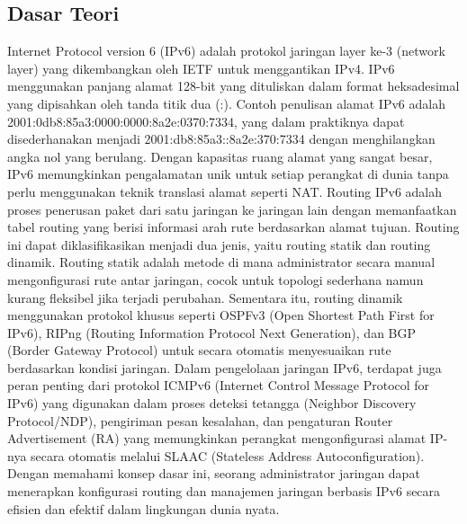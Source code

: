 \subsection{Dasar Teori}
Internet Protocol version 6 (IPv6) adalah protokol jaringan layer ke-3 (network layer) yang dikembangkan oleh IETF untuk menggantikan IPv4. IPv6 menggunakan panjang alamat 128-bit yang dituliskan dalam format heksadesimal yang dipisahkan oleh tanda titik dua (:). Contoh penulisan alamat IPv6 adalah 2001:0db8:85a3:0000:0000:8a2e:0370:7334, yang dalam praktiknya dapat disederhanakan menjadi 2001:db8:85a3::8a2e:370:7334 dengan menghilangkan angka nol yang berulang. Dengan kapasitas ruang alamat yang sangat besar, IPv6 memungkinkan pengalamatan unik untuk setiap perangkat di dunia tanpa perlu menggunakan teknik translasi alamat seperti NAT. Routing IPv6 adalah proses penerusan paket dari satu jaringan ke jaringan lain dengan memanfaatkan tabel routing yang berisi informasi arah rute berdasarkan alamat tujuan. Routing ini dapat diklasifikasikan menjadi dua jenis, yaitu routing statik dan routing dinamik. Routing statik adalah metode di mana administrator secara manual mengonfigurasi rute antar jaringan, cocok untuk topologi sederhana namun kurang fleksibel jika terjadi perubahan. Sementara itu, routing dinamik menggunakan protokol khusus seperti OSPFv3 (Open Shortest Path First for IPv6), RIPng (Routing Information Protocol Next Generation), dan BGP (Border Gateway Protocol) untuk secara otomatis menyesuaikan rute berdasarkan kondisi jaringan. Dalam pengelolaan jaringan IPv6, terdapat juga peran penting dari protokol ICMPv6 (Internet Control Message Protocol for IPv6) yang digunakan dalam proses deteksi tetangga (Neighbor Discovery Protocol/NDP), pengiriman pesan kesalahan, dan pengaturan Router Advertisement (RA) yang memungkinkan perangkat mengonfigurasi alamat IP-nya secara otomatis melalui SLAAC (Stateless Address Autoconfiguration). Dengan memahami konsep dasar ini, seorang administrator jaringan dapat menerapkan konfigurasi routing dan manajemen jaringan berbasis IPv6 secara efisien dan efektif dalam lingkungan dunia nyata.
